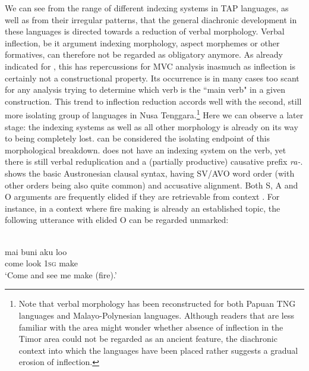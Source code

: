 \largerpage[-1]
We can see from the range of different indexing systems in TAP languages, as well as from their irregular patterns, that the general diachronic development in these languages is directed towards a reduction of verbal morphology. Verbal inflection, be it argument indexing morphology, aspect morphemes or other formatives, can therefore not be regarded as obligatory anymore. As already indicated for , this has repercussions for MVC analysis inasmuch as inflection is certainly not a constructional property. Its occurrence is in many cases too scant for any analysis trying to determine which verb is the ``main verb" in a given construction. This trend to inflection reduction accords well with the second, still more isolating group of languages in Nusa Tenggara.\footnote{Note that verbal morphology has been reconstructed for both Papuan TNG languages and Malayo-Polynesian languages. Although readers that are less familiar with the area might wonder whether absence of inflection in the Timor area could not be regarded as an ancient feature, the diachronic context into which the languages have been placed rather suggests a gradual erosion of inflection.} Here we can observe a later stage: the indexing systems as well as all other morphology is already on its way to being completely lost.  can be considered the isolating endpoint of this morphological breakdown.  does not have an indexing system on the verb, yet there is still verbal reduplication and a (partially productive) causative prefix \textit{ra-}.  shows the basic Austronesian clausal syntax, having SV/AVO word order (with other orders being also quite common) and accusative alignment. Both S, A and O arguments are frequently elided if they are retrievable from context \citep{bowden2006}. For instance, in a context where fire making is already an established topic, the following utterance with elided O can be regarded unmarked:

\ea 
{}\\
\gll mai buni aku loo \\
come look \textsc{1}\textsc{sg} make \\
\glft ‘Come and see me make (fire).’
\z

